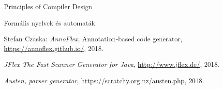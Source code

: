 \begin{thebibliography}{x}

Principles of Compiler Design

Formális nyelvek és automaták

Stefan Czaska: \emph{AnnoFlex}, Annotation-based code generator,
\url{https://annoflex.github.io/}, 2018.

\emph{JFlex The Fast Scanner Generator for Java},
\url{http://www.jflex.de/}, 2018.

\emph{Austen, parser generator},
\url{https://scratchy.org.nz/austen.php}, 2018.

\end{thebibliography}
